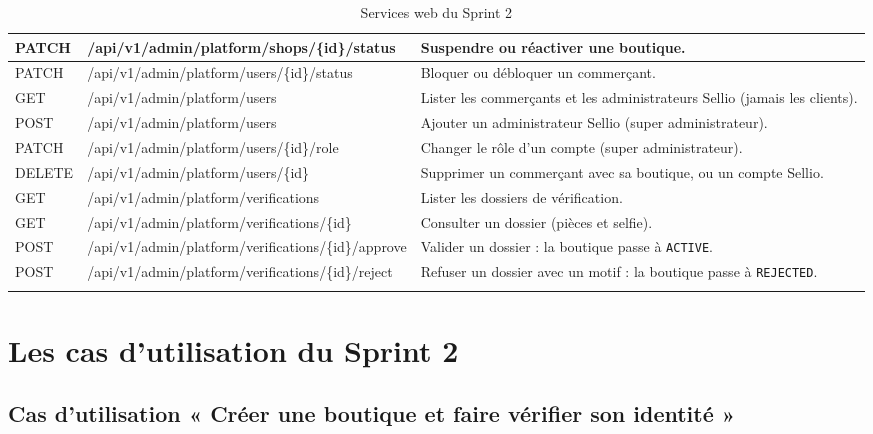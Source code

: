 \begin{longtable}{|p{1.8cm}|p{6.8cm}|p{6.2cm}|}
\hline
PATCH & /api/v1/admin/platform/shops/\{id\}/status & Suspendre ou réactiver une boutique. \\
\hline
PATCH & /api/v1/admin/platform/users/\{id\}/status & Bloquer ou débloquer un commerçant. \\
\hline
GET & /api/v1/admin/platform/users & Lister les commerçants et les administrateurs Sellio (jamais les clients). \\
\hline
POST & /api/v1/admin/platform/users & Ajouter un administrateur Sellio (super administrateur). \\
\hline
PATCH & /api/v1/admin/platform/users/\{id\}/role & Changer le rôle d'un compte (super administrateur). \\
\hline
DELETE & /api/v1/admin/platform/users/\{id\} & Supprimer un commerçant avec sa boutique, ou un compte Sellio. \\
\hline
GET & /api/v1/admin/platform/verifications & Lister les dossiers de vérification. \\
\hline
GET & /api/v1/admin/platform/verifications/\{id\} & Consulter un dossier (pièces et selfie). \\
\hline
POST & /api/v1/admin/platform/verifications/\{id\}/approve & Valider un dossier : la boutique passe à \texttt{ACTIVE}. \\
\hline
POST & /api/v1/admin/platform/verifications/\{id\}/reject & Refuser un dossier avec un motif : la boutique passe à \texttt{REJECTED}. \\
\hline
\caption{Services web du Sprint 2}
\label{tab:ws-sprint2}
\end{longtable}

\section{Les cas d'utilisation du Sprint 2}
\subsection{Cas d'utilisation « Créer une boutique et faire vérifier son identité »}
